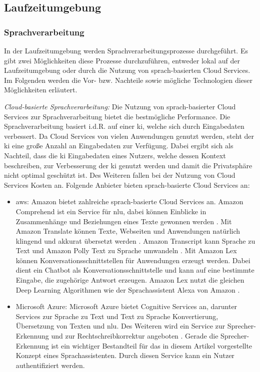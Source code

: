 \subsection{Laufzeitumgebung}
\subsubsection{Sprachverarbeitung}
In der Laufzeitumgebung werden Sprachverarbeitungsprozesse durchgeführt. Es gibt zwei Möglichkeiten diese Prozesse durchzuführen, entweder lokal auf der Laufzeitumgebung oder durch die Nutzung von sprach-basierten Cloud Services. Im Folgenden werden die Vor- bzw. Nachteile sowie mögliche Technologien dieser Möglichkeiten erläutert.
\begin{description}
	\item \textit{Cloud-basierte Sprachverarbeitung:} Die Nutzung von sprach-basierter Cloud Services zur Sprachverarbeitung bietet die bestmögliche Performance. Die Sprachverarbeitung basiert i.d.R. auf einer \ac{ki}, welche sich durch Eingabedaten verbessert. Da Cloud Services von vielen Anwendungen genutzt werden, steht der \ac{ki} eine große Anzahl an Eingabedaten zur Verfügung. Dabei ergibt sich als Nachteil, dass die \ac{ki} Eingabedaten eines Nutzers, welche dessen Kontext beschreiben, zur Verbesserung der \ac{ki} genutzt werden und damit die Privatsphäre nicht optimal geschützt ist. Des Weiteren fallen bei der Nutzung von Cloud Services Kosten an. Folgende Anbieter bieten sprach-basierte Cloud Services an:
	\begin{itemize}
		\item \ac{aws}: Amazon bietet zahlreiche sprach-basierte Cloud Services an. Amazon Comprehend ist ein Service für \ac{nlu}, dabei können Einblicke in Zusammenhänge und Beziehungen eines Texte gewonnen werden \cite{AmazonComprehed}. Mit Amazon Translate können Texte, Webseiten und Anwendungen natürlich klingend und akkurat übersetzt werden \cite{AmazonTranslate}. Amazon Transcript kann Sprache zu Text und Amazon Polly Text zu Sprache umwandeln \cite{AmazonTranscript} \cite{AmazonPolly}. Mit Amazon Lex können Konversationsschnittstellen für Anwendungen erzeugt werden. Dabei dient ein Chatbot als Konversationsschnittstelle und kann auf eine bestimmte Eingabe, die zugehörige Antwort erzeugen. Amazon Lex nutzt die gleichen Deep Learning Algorithmen wie der Sprachassistent Alexa von Amazon \cite{AmazonLex}.
		\item Microsoft Azure: Microsoft Azure bietet Cognitive Services an, darunter Services zur Sprache zu Text und Text zu Sprache Konvertierung, Übersetzung von Texten und \ac{nlu}. Des Weiteren wird ein Service zur Sprecher-Erkennung und zur Rechtschreibkorrektur angeboten \cite{MicrosoftAzureCognitiveServices}. Gerade die Sprecher-Erkennung ist ein wichtiger Bestandteil für das in diesem Artikel vorgestellte Konzept eines Sprachassistenten. Durch diesen Service kann ein Nutzer authentifiziert werden.  

\end{itemize}
\end{description}
